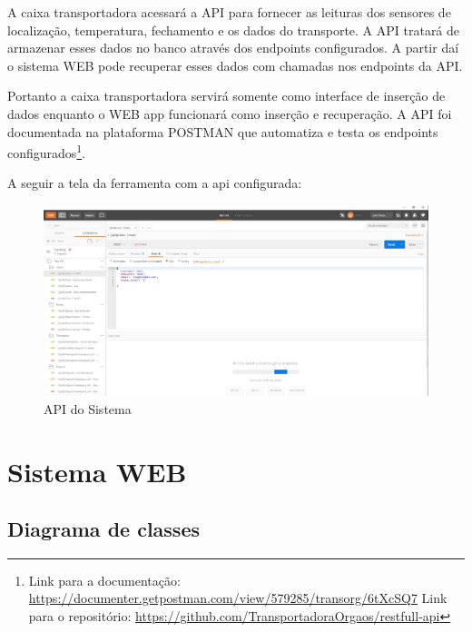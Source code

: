 			A caixa transportadora acessará a API para fornecer as leituras dos sensores de localização, temperatura, fechamento e os dados do transporte. A API tratará de armazenar esses dados no banco através dos endpoints configurados. A partir daí o sistema WEB pode recuperar esses dados com chamadas nos endpoints da API. 
			
			Portanto a caixa transportadora servirá somente como interface de inserção de dados enquanto o WEB app funcionará como inserção e recuperação. A API foi documentada na plataforma POSTMAN que automatiza e testa os endpoints configurados\footnote{Link para a documentação: \href{https://documenter.getpostman.com/view/579285/transorg/6tXcSQ7}{https://documenter.getpostman.com/view/579285/transorg/6tXcSQ7} Link para o repositório: \href{https://github.com/TransportadoraOrgaos/restfull-api}{https://github.com/TransportadoraOrgaos/restfull-api}}. 
			
			A seguir a tela da ferramenta com a api configurada:
			
			\begin{figure}[H]
				\centering
				\includegraphics[width=16cm]{figuras/api_software.JPG}
				\caption{API do Sistema}
			\end{figure}
	
			
			
			
			
			
\section{Sistema WEB}

\subsection{Diagrama de classes}

